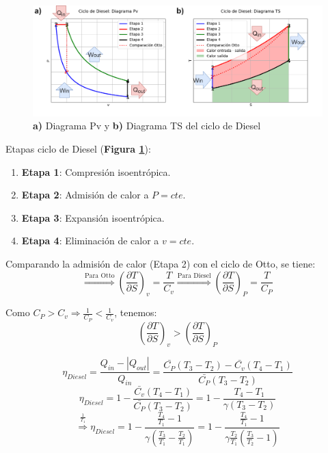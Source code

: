             \begin{figure}
                \includegraphics[width=\textwidth]{img/ciclos/ciclo_diesel.png}
                \caption[Diagramas Ciclos de Diesel]{\textbf{a)} Diagrama Pv y \textbf{b)} Diagrama TS del ciclo de Diesel}
                \label{fig:ciclo_diesel}
            \end{figure}
            
            Etapas ciclo de Diesel (\textbf{Figura \ref{fig:ciclo_diesel}}):
            
            \begin{enumerate}
                \item \textbf{Etapa 1}: Compresión isoentrópica.
                \item \textbf{Etapa 2}: Admisión de calor a \(P=cte\).
                \item \textbf{Etapa 3}: Expansión isoentrópica.
                \item \textbf{Etapa 4}: Eliminación de calor a \(v=cte\).
            \end{enumerate}
            
            Comparando la admisión de calor (Etapa 2) con el ciclo de Otto, se tiene:
            \[\overset{\text{Para Otto}}{\Rightarrow} \left ( \frac{\partial T}{\partial S} \right )_{v} = \frac{T}{C_{v}} \overset{\text{Para Diesel}}{\Rightarrow} \left ( \frac{\partial T}{\partial S} \right )_{P} = \frac{T}{C_{P}}\]
            
            Como \(C_{P} > C_{v} \Rightarrow \frac{1}{C_{P}} < \frac{1}{C_{v}}\), tenemos:
            \[\left ( \frac{\partial T}{\partial S} \right )_{v} > \left ( \frac{\partial T}{\partial S} \right )_{P}\]
            
            \[\eta_{Diesel} = \frac{Q_{in}-|Q_{out}|}{Q_{in}} = \frac{\bar{C_{P}}(T_{3}-T_{2})-\bar{C_{v}}(T_{4}-T_{1})}{\bar{C_{P}}(T_{3}-T_{2})}\]
            \[\eta_{Diesel} = 1-\frac{\bar{C_{v}}(T_{4}-T_{1})}{\bar{C_{P}}(T_{3}-T_{2})}=1-\frac{T_{4}-T_{1}}{\gamma (T_{3}-T_{2})}\]
            \[\overset{\frac{1}{T_{1}}}{\Rightarrow} \eta_{Diesel} = 1 - \frac{\frac{T_{4}}{T_{1}} - 1}{\gamma \left ( \frac{T_{3}}{T_{1}} - \frac{T_{2}}{T_{1}} \right )} = 1 - \frac{\frac{T_{4}}{T_{1}} - 1}{\gamma \frac{T_{2}}{T_{1}} \left ( \frac{T_{3}}{T_{2}} - 1 \right )}\]
            
